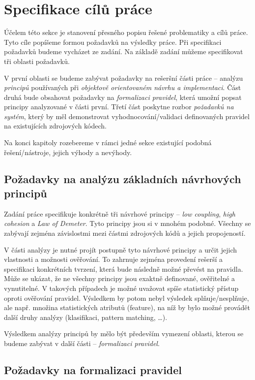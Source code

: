 \chapter{Specifikace cílů práce}

Účelem této sekce je stanovení přesného popisu řešené problematiky a cílů práce. Tyto cíle popíšeme formou požadavků na výsledky práce. Při specifikaci požadavků budeme vycházet ze zadání. Na základě zadání můžeme specifikovat tři oblasti požadavků.

V první oblasti se budeme zabývat požadavky na rešeršní části práce -- analýzu \emph{principů} používaných při \emph{objektově orientovaném návrhu a implementaci}. Část druhá bude obsahovat požadavky na \emph{formalizaci pravidel}, která umožní popsat principy analyzované v části první. Třetí část poskytne rozbor \emph{požadavků na systém}, který by měl demonstrovat vyhodnocování/validaci definovaných pravidel na existujících zdrojových kódech.

Na konci kapitoly rozebereme v rámci jedné sekce existující podobná řešení/nástroje, jejich výhody a nevýhody.

\section{Požadavky na analýzu základních návrhových principů}

Zadání práce specifikuje konkrétně tři návrhové principy -- \emph{low coupling}, \emph{high cohesion} a \emph{Law of Demeter}. Tyto principy jsou si v mnohém podobné. Všechny se zabývají zejména závislostmi mezi částmi zdrojových kódů a jejich propojeností.

V části analýzy je nutné projít postupně tyto návrhové principy a určit jejich vlastnosti a možnosti ověřování. To zahrnuje zejména provedení rešerší a specifikaci konkrétních tvrzení, která bude následně možné převést na pravidla. Může se ukázat, že ne všechny principy jsou exaktně definované, ověřitelné a vynutitelné. V takových případech je možné uvažovat spíše statistický přístup oproti ověřování pravidel. Výsledkem by potom nebyl výsledek splňuje/nesplňuje, ale např. množina statistických atributů (feature), na níž by bylo možné provádět další druhy analýzy (klasifikaci, pattern matching, \ldots).

Výsledkem analýzy principů by mělo být především vymezení oblasti, kterou se budeme zabývat v další části -- \emph{formalizaci pravidel}.

\section{Požadavky na formalizaci pravidel}

